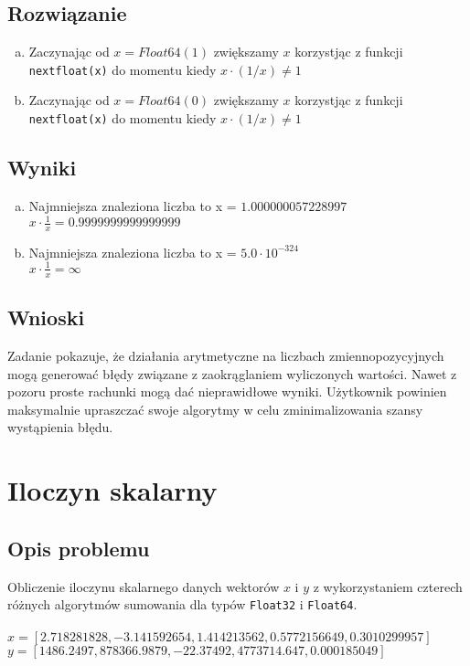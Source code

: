 \documentclass[a4paper]{article}
\begin{document}
    \subsection{Rozwiązanie}
        \begin{enumerate}[a)]
            \item Zaczynając od \(x = Float64(1)\) zwiększamy $x$ korzystjąc z funkcji \texttt{nextfloat(x)} do momentu kiedy \(x\cdot (1/{x})\neq 1\)
            \item Zaczynając od \(x = Float64(0)\) zwiększamy $x$ korzystjąc z funkcji \texttt{nextfloat(x)} do momentu kiedy \(x\cdot (1/{x})\neq 1\)
        \end{enumerate}
    
    \subsection{Wyniki}
        \begin{enumerate}[a)]
            \item Najmniejsza znaleziona liczba to x = $1.000000057228997$ \\
            \(x \cdot \frac{1}{x} = 0.9999999999999999 \)
            \item Najmniejsza znaleziona liczba to x = $5.0 \cdot 10^{-324}$ \\
            \(x \cdot \frac{1}{x} = \infty \)
        \end{enumerate}
    
    \subsection{Wnioski}
    Zadanie pokazuje, że działania arytmetyczne na liczbach zmiennopozycyjnych mogą generować błędy związane z zaokrąglaniem wyliczonych wartości. Nawet z pozoru proste rachunki mogą dać nieprawidłowe wyniki. Użytkownik powinien maksymalnie upraszczać swoje algorytmy w celu zminimalizowania szansy wystąpienia błędu. 

\section{Iloczyn skalarny}
    \subsection{Opis problemu}
    Obliczenie iloczynu skalarnego danych wektorów $x$ i $y$ z wykorzystaniem czterech różnych algorytmów sumowania dla typów \texttt{Float32} i \texttt{Float64}. \\ \\
    $x = [2.718281828, -3.141592654, 1.414213562, 0.5772156649, 0.3010299957]$ \\
    $y = [1486.2497, 878366.9879, -22.37492, 4773714.647, 0.000185049]$ \\
    
\end{document}

